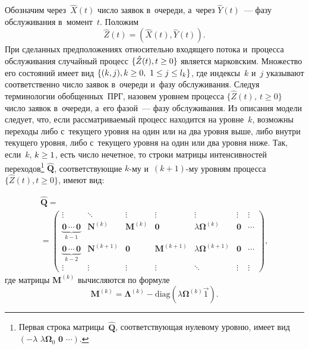\begin{multicols}{2}
Обозначим через~$\hat{X}(t)$ число заявок в~очереди, а~через $\hat{Y}(t)$~--- фазу обслуживания в~момент~$t$.
Положим 
$$
\hat{Z}(t)=\left(\hat{X}(t),\hat{Y}(t)\right).
$$
При сделанных предположениях относительно входящего потока
и~процесса обслуживания случайный процесс
$\{\hat{Z}(t), t \hm\ge 0\}$ является марковским.
Множество его состояний имеет
вид ${\{(k,j),k \hm \ge 0,\ 1 \hm\le j \hm\le l_k \}}$,
где индексы~$k$ и~$j$ указывают соответственно
число заявок в~очереди и~фазу обслуживания.
Следуя терминологии обобщенных~ПРГ, назовем уровнем процесса $\{\hat{Z}(t),\ t \ge 0\}$
число заявок в~очереди, а~его фазой~--- фазу обслуживания.
Из описания модели следует, что, если рассматриваемый процесс
находится на уровне~$k$, возможны переходы либо с~текущего уровня на один или 
на два уровня выше, либо внут\-ри текущего уровня,
либо с~текущего уровня на один или два уровня ниже.
Так, если~$k$, $k\hm\ge 1$, есть чис\-ло нечетное, то
строки матрицы интенсивностей переходов\footnote{Первая строка
матрицы~$\hat{\mathbf{Q}}$, соответствующая нулевому уровню,
имеет вид ${(- \lambda \, \, \lambda {\bm{\Omega}}_0 \,\, \mathbf{0} \,\, \cdots  )}$.}
$\hat{\mathbf{Q}}$,
соответствующие $k$-му и~$(k+1)$-му уровням процесса $\{\hat{Z}(t), t \ge 0\}$,  
имеют вид:

\vspace*{-3pt}

\noindent
\begin{multline}
\hat{\mathbf{Q}}
={}\\
\!\!\!\!\!=\!\!
\begin{pmatrix}\!
\vdots  & \ddots  &   \vdots  &   \vdots &   \vdots &  \vdots  &   \vdots \\
\underbrace{\mathbf{0} \, \cdots \,  \mathbf{0}}_{k-1} & \mathbf{N}^{(k)} &  \mathbf{M}^{(k)} 
&   \mathbf{0} &   \lambda \bm{\Omega}^{(k)} &  \mathbf{0} &   \cdots \\
\underbrace{\mathbf{0} \, \cdots \,  \mathbf{0}}_{k-2} & \mathbf{N}^{(k+1)} &    \mathbf{0}  
&  \mathbf{M}^{(k+1)} &  \lambda \bm{\Omega}^{(k+1)} &  \mathbf{0} &   \cdots \\
\vdots  & \vdots  &   \vdots  &   \vdots &   \ddots &  \vdots  &   \vdots \!\!
\end{pmatrix}\!,\!
\label{e1}
\end{multline}
где матрицы $\mathbf{M}^{(k)}$ вычисляются по формуле 
$$
\mathbf{M}^{(k)}=\bm{\Lambda}^{(k)}-\mathrm{diag}
\left(\lambda \bm{\Omega}^{(k)} \vec{1} \right).
$$


\end{multicols}
